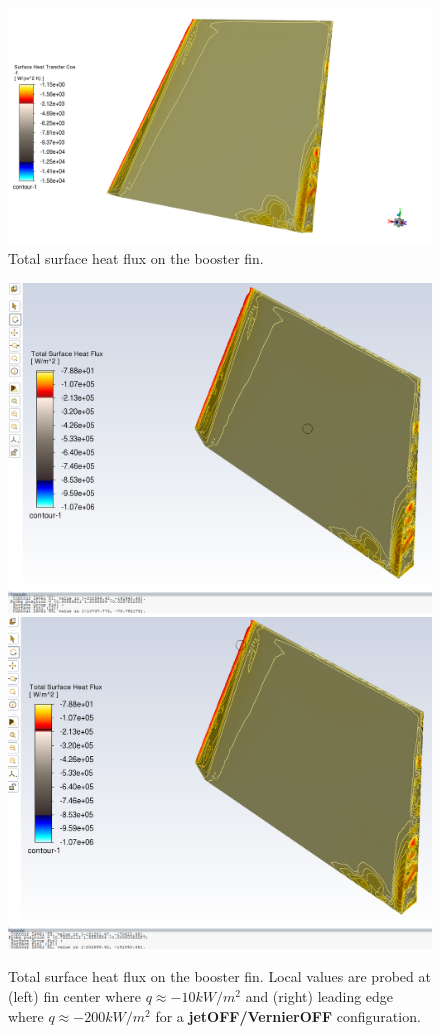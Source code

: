 \documentclass[12pt]{article}
\begin{document}
\begin{figure}[H] %
    \centering
    \includegraphics[width=0.95\linewidth]{figs/t136s/t136s_M5p26_jetOFFVernierOFF_FIN-HTC.png}
    \caption{Total surface heat flux on the booster fin.}
    \label{fig:t136s_fin_htc_offoff}
\end{figure}

\begin{figure}[H] %
    \centering
    \includegraphics[width=0.495\linewidth]{figs/t136s/fin_hf_center.PNG}
    \includegraphics[width=0.495\linewidth]{figs/t136s/fin_hf_max.PNG}
    \caption{Total surface heat flux on the booster fin. Local values are probed at (left) fin center where $q \approx - 10 kW/m^2$ and (right) leading edge where $q \approx - 200 kW/m^2$ for a \textbf{jetOFF/VernierOFF} configuration.}
    \label{fig:t136s_fin_hf}
\end{figure}
\end{document}

